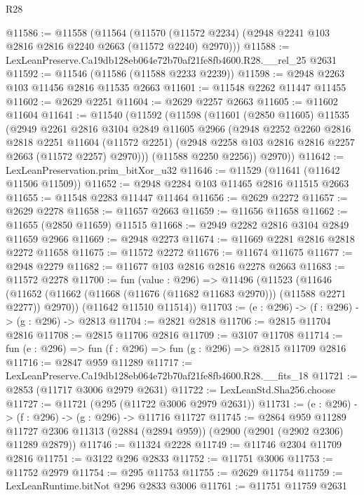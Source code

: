 \begin{lexlean}{R28}
\begin{coremodule}
@11586 := @11558
    (@11564 (@11570 (@11572 @2234) (@2948 @2241 @103 @2816 @2816 @2240 @2663 (@11572 @2240) @2970)))
@11588 := LexLeanPreserve.Ca19db128eb064e72b70af21fe8fb4600.R28.__rel_25 @2631
@11592 := @11546 (@11586 (@11588 @2233 @2239))
@11598 := @2948 @2263 @103 @11456 @2816 @11535 @2663
@11601 := @11548 @2262 @11447 @11455
@11602 := @2629 @2251
@11604 := @2629 @2257 @2663
@11605 := @11602 @11604
@11641 := @11540
    (@11592
      (@11598
        (@11601
          (@2850 @11605)
          @11535
          (@2949
            @2261
            @2816
            @3104
            @2849
            @11605
            @2966
            (@2948
              @2252
              @2260
              @2816
              @2818
              @2251
              @11604
              (@11572 @2251)
              (@2948 @2258 @103 @2816 @2816 @2257 @2663 (@11572 @2257) @2970)))
          (@11588 @2250 @2256))
        @2970))
@11642 := LexLeanPreservation.prim_bitXor_u32
@11646 := @11529 (@11641 (@11642 @11506 @11509))
@11652 := @2948 @2284 @103 @11465 @2816 @11515 @2663
@11655 := @11548 @2283 @11447 @11464
@11656 := @2629 @2272
@11657 := @2629 @2278
@11658 := @11657 @2663
@11659 := @11656 @11658
@11662 := @11655 (@2850 @11659) @11515
@11668 := @2949 @2282 @2816 @3104 @2849 @11659 @2966
@11669 := @2948 @2273
@11674 := @11669 @2281 @2816 @2818 @2272 @11658
@11675 := @11572 @2272
@11676 := @11674 @11675
@11677 := @2948 @2279
@11682 := @11677 @103 @2816 @2816 @2278 @2663
@11683 := @11572 @2278
@11700 := fun (value : @296) =>
  @11496
    (@11523
      (@11646 (@11652 (@11662 (@11668 (@11676 (@11682 @11683 @2970))) (@11588 @2271 @2277)) @2970))
      (@11642 @11510 @11514))
@11703 := (e : @296) -> (f : @296) -> (g : @296) -> @2813
@11704 := @2821 @2818
@11706 := @2815 @11704 @2816
@11708 := @2815 @11706 @2816
@11709 := @3107 @11708
@11714 := fun (e : @296) => fun (f : @296) => fun (g : @296) => @2815 @11709 @2816
@11716 := @2847 @959 @11289
@11717 := LexLeanPreserve.Ca19db128eb064e72b70af21fe8fb4600.R28.__fits_18
@11721 := @2853 (@11717 @3006 @2979 @2631)
@11722 := LexLeanStd.Sha256.choose
@11727 := @11721 (@295 (@11722 @3006 @2979 @2631))
@11731 := (e : @296) -> (f : @296) -> (g : @296) -> @11716 @11727
@11745 := @2864
    @959
    @11289
    @11727
    @2306
    @11313
    (@2884 (@2894 @959))
    (@2900 (@2901 (@2902 @2306) @11289 @2879))
@11746 := @11324 @2228
@11749 := @11746 @2304 @11709 @2816
@11751 := @3122 @296 @2833
@11752 := @11751 @3006
@11753 := @11752 @2979
@11754 := @295 @11753
@11755 := @2629 @11754
@11759 := LexLeanRuntime.bitNot @296 @2833 @3006
@11761 := @11751 @11759 @2631

\end{coremodule}
\end{lexlean}
